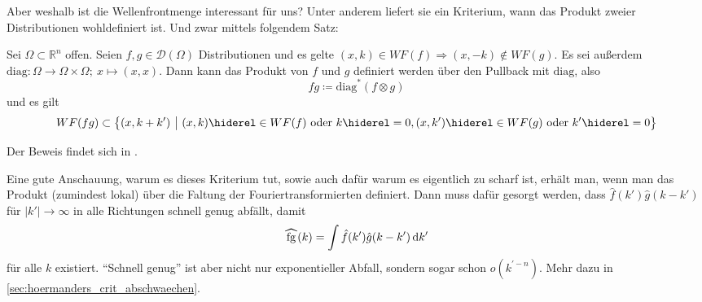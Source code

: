 Aber weshalb ist die Wellenfrontmenge interessant für uns? Unter anderem liefert sie ein Kriterium, wann das Produkt zweier Distributionen wohldefiniert ist. Und zwar mittels folgendem Satz:

\begin{theorem}
\label{thm:hoermanders_criterion}
    Sei $\Omega \subset \mathbb{R}^n$ offen.
    Seien $f,g \in \mathcal{D}(\Omega)$ Distributionen und es gelte $(x,k) \in WF(f) \Rightarrow (x,-k) \notin WF(g)$. Es sei außerdem $\mathrm{diag} : \Omega \rightarrow \Omega \times \Omega; ~x \mapsto (x,x)$. Dann kann das Produkt von $f$ und $g$ definiert werden über den Pullback mit $\mathrm{diag}$, also
    \begin{equation*}
        f g \coloneqq \mathrm{diag}^* (f \otimes g)
    \end{equation*}
    und es gilt
    \begin{dmath*}
        WF(fg) \subset \left\{(x,k+k') ~\big|~ (x,k) \hiderel\in WF(f) \textrm{ oder } k \hiderel = 0,\\ (x,k') \hiderel\in WF(g) \textrm{ oder } k'\hiderel=0 \right\}
    \end{dmath*}
\end{theorem}

Der Beweis findet sich in \textcite{Hoermander1985}.

Eine gute Anschauung, warum es dieses Kriterium tut, sowie auch dafür warum es eigentlich zu scharf ist, erhält man, wenn man das Produkt (zumindest lokal) über die Faltung der Fouriertransformierten definiert. Dann muss dafür gesorgt werden, dass $\hat f(k') \hat g(k-k')$ für $|k'| \to \infty$ in alle Richtungen schnell genug abfällt, damit
\begin{equation*}
    \rwhat{fg}(k) = \int \hat f(k') \hat g(k-k') \d k'
\end{equation*}
für alle $k$ existiert. "`Schnell genug"' ist aber nicht nur exponentieller Abfall, sondern sogar schon $o(k^{\prime -n})$. Mehr dazu in \cref{sec:hoermanders_crit_abschwaechen}.


